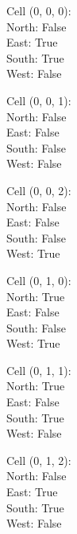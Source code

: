 \documentclass{article}
\begin{document}
\begin{multicols*}{3}

Cell (0, 0, 0):\\
\-\hspace{2cm}North: False\\
\-\hspace{2cm}East: True\\
\-\hspace{2cm}South: True\\
\-\hspace{2cm}West: False

Cell (0, 0, 1):\\
\-\hspace{2cm}North: False\\
\-\hspace{2cm}East: False\\
\-\hspace{2cm}South: False\\
\-\hspace{2cm}West: False

Cell (0, 0, 2):\\
\-\hspace{2cm}North: False\\
\-\hspace{2cm}East: False\\
\-\hspace{2cm}South: False\\
\-\hspace{2cm}West: True

Cell (0, 1, 0):\\
\-\hspace{2cm}North: True\\
\-\hspace{2cm}East: False\\
\-\hspace{2cm}South: False\\
\-\hspace{2cm}West: True

Cell (0, 1, 1):\\
\-\hspace{2cm}North: True\\
\-\hspace{2cm}East: False\\
\-\hspace{2cm}South: True\\
\-\hspace{2cm}West: False

Cell (0, 1, 2):\\
\-\hspace{2cm}North: False\\
\-\hspace{2cm}East: True\\
\-\hspace{2cm}South: True\\
\-\hspace{2cm}West: False


\end{multicols*}
\end{document}
